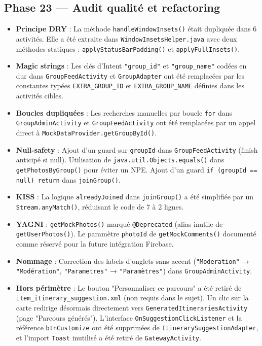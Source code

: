 \documentclass{article}
\begin{document}
\subsection*{Phase 23 — Audit qualité et refactoring}
\begin{itemize}
    \item \textbf{Principe DRY} : La méthode \texttt{handleWindowInsets()} était dupliquée dans 6 activités. Elle a été extraite dans \texttt{WindowInsetsHelper.java} avec deux méthodes statiques : \texttt{applyStatusBarPadding()} et \texttt{applyFullInsets()}.
    \item \textbf{Magic strings} : Les clés d'Intent \texttt{"group\_id"} et \texttt{"group\_name"} codées en dur dans \texttt{GroupFeedActivity} et \texttt{GroupAdapter} ont été remplacées par les constantes typées \texttt{EXTRA\_GROUP\_ID} et \texttt{EXTRA\_GROUP\_NAME} définies dans les activités cibles.
    \item \textbf{Boucles dupliquées} : Les recherches manuelles par boucle \texttt{for} dans \texttt{GroupAdminActivity} et \texttt{GroupFeedActivity} ont été remplacées par un appel direct à \texttt{MockDataProvider.getGroupById()}.
    \item \textbf{Null-safety} : Ajout d'un guard sur \texttt{groupId} dans \texttt{GroupFeedActivity} (finish anticipé si null). Utilisation de \texttt{java.util.Objects.equals()} dans \texttt{getPhotosByGroup()} pour éviter un NPE. Ajout d'un guard \texttt{if (groupId == null) return} dans \texttt{joinGroup()}.
    \item \textbf{KISS} : La logique \texttt{alreadyJoined} dans \texttt{joinGroup()} a été simplifiée par un \texttt{Stream.anyMatch()}, réduisant le code de 7 à 2 lignes.
    \item \textbf{YAGNI} : \texttt{getMockPhotos()} marqué \texttt{@Deprecated} (alias inutile de \texttt{getUserPhotos()}). Le paramètre \texttt{photoId} de \texttt{getMockComments()} documenté comme réservé pour la future intégration Firebase.
    \item \textbf{Nommage} : Correction des labels d'onglets sans accent (\texttt{"Moderation"} → \texttt{"Modération"}, \texttt{"Parametres"} → \texttt{"Paramètres"}) dans \texttt{GroupAdminActivity}.
    \item \textbf{Hors périmètre} : Le bouton "Personnaliser ce parcours" a été retiré de \texttt{item\_itinerary\_suggestion.xml} (non requis dans le sujet). Un clic sur la carte redirige désormais directement vers \texttt{GeneratedItinerariesActivity} (page "Parcours générés"). L'interface \texttt{OnSuggestionClickListener} et la référence \texttt{btnCustomize} ont été supprimées de \texttt{ItinerarySuggestionAdapter}, et l'import \texttt{Toast} inutilisé a été retiré de \texttt{GatewayActivity}.
\end{itemize}
\end{document}
